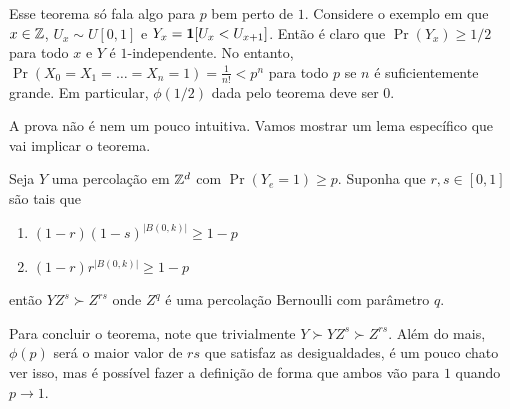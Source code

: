 \begin{remark}
	Esse teorema só fala algo para $p$ bem perto de $1$. Considere o exemplo em que
	$x \in \mathbb{Z}$, $U_x \sim U[0,1]$ e $Y_x = \bm{1} [U_x < U_{x+1}]$. Então é claro
	que $\Pr(Y_x) \geq 1/2$ para todo $x$ e $Y$ é $1$-independente. No entanto,
	$\Pr(X_0 = X_1 = \dots = X_n = 1) = \frac{1}{n!} < p^n$ para todo
	$p$ se $n$ é suficientemente grande. Em particular, $\phi(1/2)$ dada
	pelo teorema deve ser $0$.
\end{remark}

A prova não é nem um pouco intuitiva. Vamos mostrar um lema
específico que vai implicar o teorema.
\begin{lemma}
	Seja $Y$ uma percolação em $\mathbb{Z}^d$ com $\Pr(Y_e = 1) \geq p$.
	Suponha que $r,s \in [0,1]$ são tais que
	\begin{enumerate}
		\item $(1-r)(1-s)^{|B(0,k)|} \geq 1-p$
		\item $(1-r)r^{|B(0,k)|} \geq 1-p$
	\end{enumerate}
	então $YZ^{s} \succ Z^{rs}$ onde $Z^{q}$ é uma percolação Bernoulli com
	parâmetro $q$.
\end{lemma}

\begin{remark}
	Para concluir o teorema, note que trivialmente $Y \succ YZ^s \succ
	Z^{rs}$. Além
	do mais, $\phi(p)$ será o maior valor de $rs$ que satisfaz as desigualdades,
	é um pouco chato ver isso, mas é possível fazer a definição
	de forma que ambos vão para $1$ quando $p \to 1$.
\end{remark}

